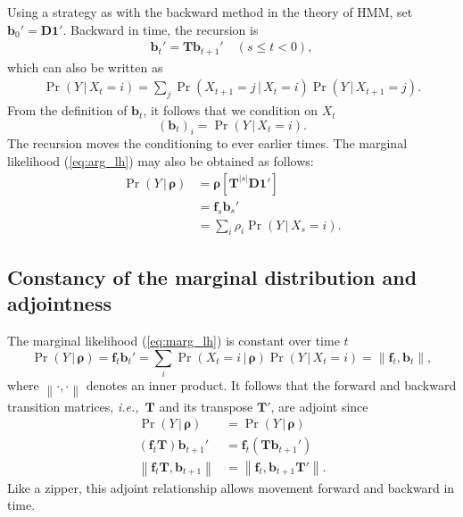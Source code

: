 \documentclass[preprint]{elsarticle}
\newcommand{\bs}[1]{\ensuremath{\boldsymbol{#1}}}
\newcommand\given{{\,|\,}}
\newcommand{\norm}[1]{\left\lVert#1\right\rVert}
\newcommand\ie{{\it i.e.,}}
\newcommand\x[1]{\ensuremath{X_{#1}}}
\newcommand\y{\ensuremath{Y}}
\newcommand\s{\ensuremath{s}}
\newcommand\fv[1]{\ensuremath{\mathbf{f}_{#1}}}
\newcommand\bv[1]{\ensuremath{\mathbf{b}_{#1}}}
\newcommand\oneC{\ensuremath{\mathbf{1}'}}
\begin{document}
Using a strategy as with the backward method in the theory of HMM, set $\bv{0}'=\mathbf{D}\oneC$. Backward in time, the recursion is
\begin{equation}
\begin{split}
\bv{t}' = \mathbf{T} \bv{t+1}' \quad (\s \le t <0),
\end{split}
\end{equation}
which can also be written as
\begin{equation}\label{eq:backwards_discrete}
\begin{split}
\Pr(\y \given \x{t}=i) = \sum_j \Pr(\x{t+1}=j \given \x{t}=i) \Pr(\y \given \x{t+1}=j).
\end{split}
\end{equation}
From the definition of $\bv{t}$, it follows that we condition on $\x{t}$
\begin{equation}
(\bv{t})_{i} = \Pr(\y \given \x{t}=i).
\end{equation}
The recursion moves the conditioning to ever earlier times. The marginal likelihood (\ref{eq:arg_lh}) may also be obtained as follows:
\begin{equation}\label{eq:marg_lh}
\begin{split}
\Pr(\y \given \bs{\rho}) &= \bs{\rho} \left[\mathbf{T}^{|\s|} \mathbf{D}\oneC\right]\\
                         &= \fv{\s} \bv{\s}' \\
                         &= \sum_i \rho_i \Pr(\y \given \x{\s}=i).
\end{split}
\end{equation}

\subsection{Constancy of the marginal distribution and adjointness}

The marginal likelihood (\ref{eq:marg_lh}) is constant over time $t$ 
\begin{equation}
\Pr(\y \given \bs{\rho}) = \fv{t}\bv{t}' =\sum_i \Pr(\x{t}=i \given \bs{\rho}) \Pr(\y \given \x{t}=i) = \norm{ \fv{t}, \bv{t} },
\end{equation}
where $\norm{ \cdot , \cdot }$ denotes an inner product.  It follows that the forward and backward transition matrices, \ie\ $\mathbf{T}$ and its transpose $\mathbf{T}'$, are adjoint since
\begin{equation}\label{eq:adjoint_discrete}
\begin{split}
\Pr(\y \given \bs{\rho})              &= \Pr(\y \given \bs{\rho}) \\
(\fv{t}\mathbf{T})\bv{t+1}' &= \fv{t} (\mathbf{T}\bv{t+1}') \\
\norm{ \fv{t}\mathbf{T},\bv{t+1} }  &= \norm{\fv{t},\bv{t+1}\mathbf{T}' }.
\end{split}
\end{equation}
Like a zipper, this adjoint relationship allows movement forward and backward in time.
\end{document}
